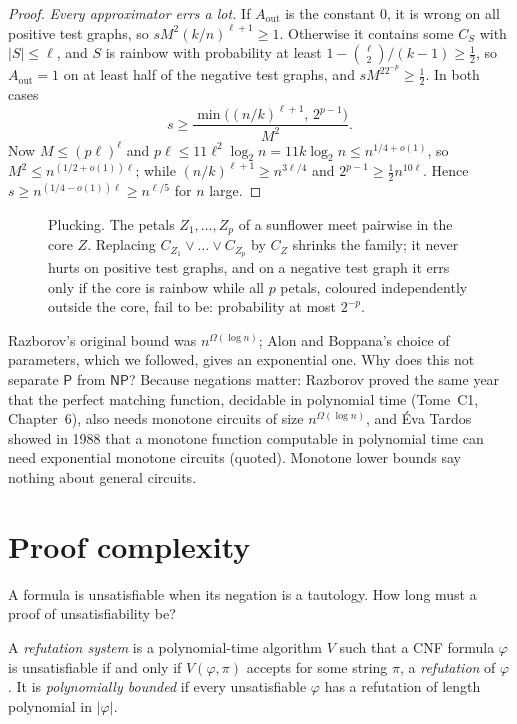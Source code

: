 \begin{proof}
\emph{Every approximator errs a lot.} If $A_{\mathrm{out}}$ is the constant $0$, it is wrong on all positive test graphs, so $sM^2(k/n)^{\ell+1}\ge1$. Otherwise it contains some $C_S$ with $|S|\le\ell$, and $S$ is rainbow with probability at least $1-\binom\ell2/(k-1)\ge\frac12$, so $A_{\mathrm{out}}=1$ on at least half of the negative test graphs, and $sM^22^{-p}\ge\frac12$. In both cases
\[
s\ge\frac{\min\bigl((n/k)^{\ell+1},\,2^{p-1}\bigr)}{M^2}.
\]
Now $M\le(p\ell)^\ell$ and $p\ell\le11\ell^2\log_2n=11k\log_2n\le n^{1/4+o(1)}$, so $M^2\le n^{(1/2+o(1))\ell}$; while $(n/k)^{\ell+1}\ge n^{3\ell/4}$ and $2^{p-1}\ge\frac12n^{10\ell}$. Hence $s\ge n^{(1/4-o(1))\ell}\ge n^{\ell/5}$ for $n$ large.
\end{proof}

\begin{figure}[ht]
\centering
{}
\caption{Plucking. The petals $Z_1,\dots,Z_p$ of a sunflower meet pairwise in the core $Z$. Replacing $C_{Z_1}\lor\dots\lor C_{Z_p}$ by $C_Z$ shrinks the family; it never hurts on positive test graphs, and on a negative test graph it errs only if the core is rainbow while all $p$ petals, coloured independently outside the core, fail to be: probability at most $2^{-p}$.}
\label{fig:sunflower}
\end{figure}

Razborov's original bound was $n^{\Omega(\log n)}$; Alon and Boppana's choice of parameters, which we followed, gives an exponential one. Why does this not separate $\mathsf P$ from $\mathsf{NP}$? Because negations matter: Razborov proved the same year that the perfect matching function, decidable in polynomial time (Tome~C1, Chapter~6), also needs monotone circuits of size $n^{\Omega(\log n)}$, and \'Eva Tardos showed in 1988 that a monotone function computable in polynomial time can need exponential monotone circuits (quoted). Monotone lower bounds say nothing about general circuits.

\section{Proof complexity}\label{sec:proofcomplexity}

A formula is unsatisfiable when its negation is a tautology. How long must a proof of unsatisfiability be?

\begin{definition}\label{def:refsystem}
A \emph{refutation system} is a polynomial-time algorithm $V$ such that a CNF formula $\varphi$ is unsatisfiable if and only if $V(\varphi,\pi)$ accepts for some string $\pi$, a \emph{refutation} of $\varphi$. It is \emph{polynomially bounded} if every unsatisfiable $\varphi$ has a refutation of length polynomial in $|\varphi|$.
\end{definition}

